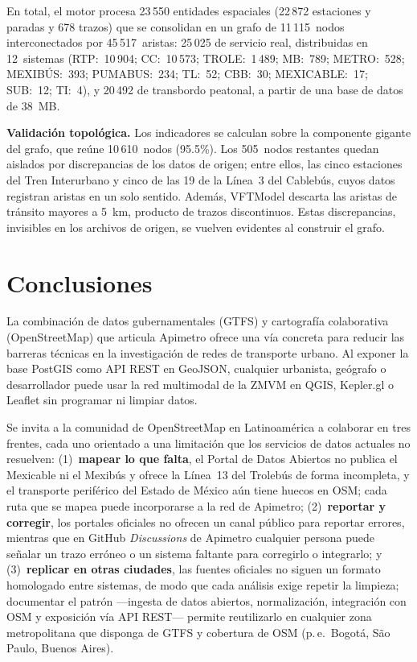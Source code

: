 \documentclass{isprs} %
\begin{document}
En total, el motor procesa 23\,550 entidades espaciales (22\,872 estaciones y
paradas y 678 trazos) que se consolidan en un grafo de 11\,115~nodos
interconectados por 45\,517~aristas: 25\,025 de servicio real, distribuidas en
12~sistemas (RTP:~10\,904; CC:~10\,573; TROLE:~1\,489; MB:~789; METRO:~528;
MEXIBÚS:~393; PUMABUS:~234; TL:~52; CBB:~30; MEXICABLE:~17; SUB:~12; TI:~4), y
20\,492 de transbordo peatonal, a partir de una base de datos de 38~MB.

\textbf{Validación topológica.}  Los indicadores se calculan sobre la componente
gigante del grafo, que reúne 10\,610~nodos (95.5\%).  Los 505~nodos restantes
quedan aislados por discrepancias de los datos de origen; entre ellos, las cinco
estaciones del Tren Interurbano y cinco de las 19 de la Línea~3 del Cablebús, cuyos
datos registran aristas en un solo sentido.  Además, VFTModel descarta las aristas
de tránsito mayores a 5~km, producto de trazos discontinuos.  Estas discrepancias,
invisibles en los archivos de origen, se vuelven evidentes al construir el grafo.

\section{Conclusiones}
\label{sec:Conclusiones}

La combinación de datos gubernamentales (GTFS) y cartografía colaborativa
(OpenStreetMap) que articula Apimetro ofrece una vía concreta para reducir las
barreras técnicas en la investigación de redes de transporte urbano.  Al exponer
la base PostGIS como API REST en GeoJSON, cualquier urbanista, geógrafo o
desarrollador puede usar la red multimodal de la ZMVM en QGIS, Kepler.gl o Leaflet
sin programar ni limpiar datos.

Se invita a la comunidad de OpenStreetMap en Latinoamérica a colaborar en tres
frentes, cada uno orientado a una limitación que los servicios de datos actuales
no resuelven: (1)~\textbf{mapear lo que falta}, el Portal de Datos Abiertos no
publica el Mexicable ni el Mexibús y ofrece la Línea~13 del Trolebús de forma
incompleta, y el transporte periférico del Estado de México aún tiene huecos en
OSM; cada ruta que se mapea puede incorporarse a la red de Apimetro;
(2)~\textbf{reportar y corregir}, los portales oficiales no ofrecen un canal
público para reportar errores, mientras que en GitHub \textit{Discussions} de
Apimetro cualquier persona puede señalar un trazo erróneo o un sistema faltante
para corregirlo o integrarlo; y (3)~\textbf{replicar en otras ciudades}, las
fuentes oficiales no siguen un formato homologado entre sistemas, de modo que cada
análisis exige repetir la limpieza; documentar el patrón ---ingesta de datos
abiertos, normalización, integración con OSM y exposición vía API REST--- permite
reutilizarlo en cualquier zona metropolitana que disponga de GTFS y cobertura de
OSM (p.\,e.\ Bogotá, São Paulo, Buenos Aires).
\end{document}
